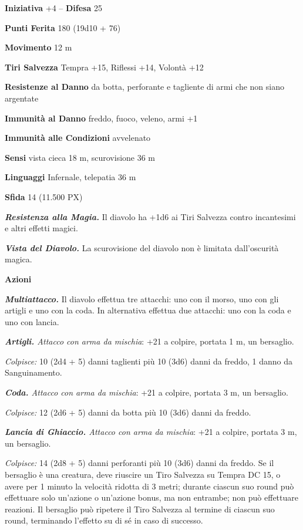 \begin{multicols}{2}
	\textbf{Iniziativa} +4 -- \textbf{Difesa} 25

	\textbf{Punti Ferita} 180 (19d10 + 76)

	\textbf{Movimento} 12 m

	\textbf{Tiri Salvezza} Tempra +15, Riflessi +14, Volontà +12

	\textbf{Resistenze al Danno} da botta, perforante e tagliente di armi che non siano argentate

	\textbf{Immunità al Danno} freddo, fuoco, veleno, armi +1

	\textbf{Immunità alle Condizioni} avvelenato

	\textbf{Sensi} vista cieca 18 m, scurovisione 36 m

	\textbf{Linguaggi} Infernale, telepatia 36 m

	\textbf{Sfida} 14 (11.500 PX)

	\textit{\textbf{Resistenza alla Magia.}} Il diavolo ha +1d6 ai Tiri Salvezza contro incantesimi e altri effetti magici.

	\textit{\textbf{Vista del Diavolo.}} La scurovisione del diavolo non è limitata dall'oscurità magica.

	\textbf{Azioni}

	\textit{\textbf{Multiattacco.}} Il diavolo effettua tre attacchi: uno con il morso, uno con gli artigli e uno con la coda. In alternativa effettua due attacchi: uno con la coda e uno con lancia.

	\textit{\textbf{Artigli.} Attacco con arma da mischia}: +21 a colpire, portata 1 m, un bersaglio.

	\textit{Colpisce:} 10 (2d4 + 5) danni taglienti più 10 (3d6) danni da freddo, 1 danno da Sanguinamento.

	\textit{\textbf{Coda.} Attacco con arma da mischia}: +21 a colpire, portata 3 m, un bersaglio.

	\textit{Colpisce:} 12 (2d6 + 5) danni da botta più 10 (3d6) danni da freddo.

	\textit{\textbf{Lancia di Ghiaccio.} Attacco con arma da mischia}: +21 a colpire, portata 3 m, un bersaglio.

	\textit{Colpisce:} 14 (2d8 + 5) danni perforanti più 10 (3d6) danni da freddo. Se il bersaglio è una creatura, deve riuscire un Tiro Salvezza su Tempra DC 15, o avere per 1 minuto la velocità ridotta di 3 metri; durante ciascun suo round può effettuare solo un'azione o un'azione bonus, ma non entrambe; non può effettuare reazioni. Il bersaglio può ripetere il Tiro Salvezza al termine di ciascun suo round, terminando l'effetto su di sé in caso di successo.


\end{multicols}
